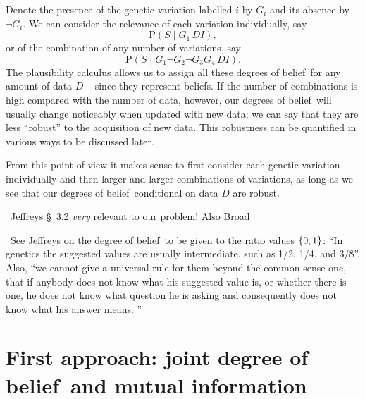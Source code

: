\documentclass[\ifafour a4paper,12pt,\else a5paper,10pt,\fi%
onecolumn,oneside,article,%
british%
]{memoir}
\theoremstyle{remark}
\theoremstyle{innote}
\newcommand*{\citey}{\parencites*}
\DeclarePairedDelimiter\set{\{}{\}}
\newcommand*{\p}{\mathrm{P}}%
\renewcommand*{\|}{\mathpunct{|}}
\newcommand*{\sect}{\S}%
\newcommand*{\puzzle}{\maltese}
\newcommand{\mynote}[1]{ {\color{notecolour}\puzzle\ #1}}
\newcommand*{\dob}{degree of belief}
\newcommand*{\dobs}{degrees of belief}
\newcommand*{\yD}{D}
\newcommand*{\yS}{S}
\newcommand*{\yI}{I}
\newcommand*{\yGv}{G}
\begin{document}
Denote the presence of the genetic variation labelled $i$ by $\yGv_i$ and its
absence by $\lnot\yGv_i$. We can consider the  relevance of each
variation individually, say
\begin{equation}
  \label{eq:pre_example_relevance_onevariation}
  \p(\yS \|\yGv_1 \,\yD \yI),
\end{equation}
or of the combination of any number of variations, say
\begin{equation}
  \label{eq:pre_example_relevance_manyvariations}
  \p(\yS \|\yGv_1 \lnot\yGv_2 \lnot\yGv_3 \yGv_4 \,\yD \yI).
\end{equation}
The plausibility calculus allows us to assign all these \dobs\ for any
amount of data $\yD$ -- since they represent beliefs. If the number of
combinations is high compared with the number of data, however, our \dobs\
will usually change noticeably when updated with new data; we can say that
they are less \enquote{robust} to the acquisition of new data. This
robustness can be quantified in various ways to be discussed later.

From this point of view it makes sense to first consider each genetic
variation individually and then larger and larger combinations of
variations, as long as we see that our \dobs\ conditional on data
$\yD$ are robust.


\mynote{Jeffreys \citey{jeffreys1939_r1983} \sect~3.2 \emph{very} relevant
  to our problem! Also Broad \citey{broad1918}}

\mynote{See Jeffreys \citey[\sect~3.1, p.~124]{jeffreys1939_r1983} on the
  \dob\ to be given to the ratio values $\set{0,1}$: \enquote{In
    genetics the suggested values are usually intermediate, such as 1/2,
    1/4, and 3/8}. Also, \enquote{we cannot give a universal rule for them
    beyond the common-sense one, that if anybody does not know what his
    suggested value is, or whether there is one, he does not know what
    question he is asking and consequently does not know what his answer
    means. }}



\section{First approach: joint \dob\ and mutual information}
\label{sec:pre_joint_prob}
\end{document}
